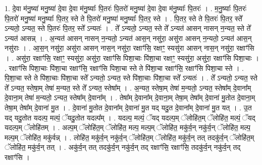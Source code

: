 \documentclass[17pt]{extarticle}
\begin{document}
1. दे॒वा म॑नु॒ष्या॑ मनु॒ष्या॑ दे॒वा दे॒वा म॑नु॒ष्याः᳚ पि॒तरः॑ पि॒तरो॑ मनु॒ष्या॑ दे॒वा दे॒वा म॑नु॒ष्याः᳚ पि॒तरः॑ । . म॒नु॒ष्याः᳚ पि॒तरः॑ पि॒तरो॑ मनु॒ष्या॑ मनु॒ष्याः᳚ पि॒तर॒ स्ते ते पि॒तरो॑ मनु॒ष्या॑ मनु॒ष्याः᳚ पि॒तर॒ स्ते । . पि॒तर॒ स्ते ते पि॒तरः॑ पि॒तर॒ स्ते᳚ ऽन्यतो॒ ऽन्यत॒ स्ते पि॒तरः॑ पि॒तर॒ स्ते᳚ ऽन्यतः॑ । . ते᳚ ऽन्यतो॒ ऽन्यत॒ स्ते ते᳚ ऽन्यत॑ आसन् नासन् न॒न्यत॒ स्ते ते᳚ ऽन्यत॑ आसन्न् । . अ॒न्यत॑ आसन् नासन् न॒न्यतो॒ ऽन्यत॑ आस॒न् नसु॑रा॒ असु॑रा आसन् न॒न्यतो॒ ऽन्यत॑ आस॒न् नसु॑राः । . आ॒स॒न् नसु॑रा॒ असु॑रा आसन् नास॒न् नसु॑रा॒ रक्षाꣳ॑सि॒ रक्षाꣳ॒॒ स्यसु॑रा आसन् नास॒न् नसु॑रा॒ रक्षाꣳ॑सि । . असु॑रा॒ रक्षाꣳ॑सि॒ रक्षाꣳ॒॒ स्यसु॑रा॒ असु॑रा॒ रक्षाꣳ॑सि पिशा॒चाः पि॑शा॒चा रक्षाꣳ॒॒ स्यसु॑रा॒ असु॑रा॒ रक्षाꣳ॑सि पिशा॒चाः । . रक्षाꣳ॑सि पिशा॒चाः पि॑शा॒चा रक्षाꣳ॑सि॒ रक्षाꣳ॑सि पिशा॒चा स्ते ते पि॑शा॒चा रक्षाꣳ॑सि॒ रक्षाꣳ॑सि पिशा॒चा स्ते । . पि॒शा॒चा स्ते ते पि॑शा॒चाः पि॑शा॒चा स्ते᳚ ऽन्यतो॒ ऽन्यत॒ स्ते पि॑शा॒चाः पि॑शा॒चा स्ते᳚ ऽन्यतः॑ । . ते᳚ ऽन्यतो॒ ऽन्यत॒ स्ते ते᳚ ऽन्यत॒ स्तेषा॒म् तेषा॑ म॒न्यत॒ स्ते ते᳚ ऽन्यत॒ स्तेषा᳚म् । . अ॒न्यत॒ स्तेषा॒म् तेषा॑ म॒न्यतो॒ ऽन्यत॒ स्तेषा᳚म् दे॒वाना᳚म् दे॒वाना॒म् तेषा॑ म॒न्यतो॒ ऽन्यत॒ स्तेषा᳚म् दे॒वाना᳚म् । . तेषा᳚म् दे॒वाना᳚म् दे॒वाना॒म् तेषा॒म् तेषा᳚म् दे॒वाना॑ मु॒तोत दे॒वाना॒म् तेषा॒म् तेषा᳚म् दे॒वाना॑ मु॒त । . दे॒वाना॑ मु॒तोत दे॒वाना᳚म् दे॒वाना॑ मु॒त यद् यदु॒त दे॒वाना᳚म् दे॒वाना॑ मु॒त यत् । . उ॒त यद् यदु॒तोत यदल्प॒ मल्पं॒ ॅयदु॒तोत यदल्प᳚म् । . यदल्प॒ मल्पं॒ ॅयद् यदल्प॒म् ॅलोहि॑त॒म् ॅलोहि॑त॒ मल्पं॒ ॅयद् यदल्प॒म् ॅलोहि॑तम् । . अल्प॒म् ॅलोहि॑त॒म् ॅलोहि॑त॒ मल्प॒ मल्प॒म् ॅलोहि॑त॒ मकु॑र्व॒न् नकु॑र्व॒न् ॅलोहि॑त॒ मल्प॒ मल्प॒म् ॅलोहि॑त॒ मकु॑र्वन्न् । . लोहि॑त॒ मकु॑र्व॒न् नकु॑र्व॒न् ॅलोहि॑त॒म् ॅलोहि॑त॒ मकु॑र्व॒न् तत् तदकु॑र्व॒न् ॅलोहि॑त॒म् ॅलोहि॑त॒ मकु॑र्व॒न् तत् । . अकु॑र्व॒न् तत् तदकु॑र्व॒न् नकु॑र्व॒न् तद् रक्षाꣳ॑सि॒ रक्षाꣳ॑सि॒ तदकु॑र्व॒न् नकु॑र्व॒न् तद् रक्षाꣳ॑सि । \newline
\end{document}
